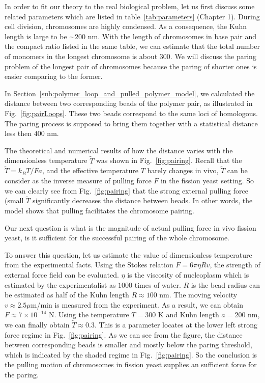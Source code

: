 In order to fit our theory to the real biological problem, let us first discuss some related parameters which are listed in table~\ref{tab:parameters} (Chapter 1). During cell division, chromosomes are highly condensed. As a consequence, the Kuhn length is large to be $\sim 200$ nm. With the length of chromosomes in base pair and the compact ratio listed in the same table, we can estimate that the total number of monomers in the longest chromosome is about $300$. We will discuss the paring problem of the longest pair of chromosomes because the paring of shorter ones is easier comparing to the former. 

In Section~\ref{sub:polymer_loop_and_pulled_polymer_model}, we calculated the distance between two corresponding beads of the polymer pair, as illustrated in Fig.~\ref{fig:pairLoops}. These two beads correspond to the same loci of homologous. The paring process is supposed to bring them together with a statistical distance less then $400$ nm. 

The theoretical and numerical results of how the distance varies with the dimensionless temperature $\tilde{T}$ was shown in Fig.~\ref{fig:pairing}. Recall that the $\tilde{T} = k_B T/F a$, and the effective temperature $T$ barely changes in vivo, $\tilde{T}$ can be consider as the inverse measure of pulling force $F$ in the fission yeast setting. So we can clearly see from Fig.~\ref{fig:pairing} that the strong external pulling force (small $\tilde{T}$ significantly decreases the distance between beads. In other words, the model shows that pulling facilitates the chromosome pairing.

Our next question is what is the magnitude of actual pulling force in vivo fission yeast, is it sufficient for the successful pairing of the whole chromosome. 

To answer this question, let us estimate the value of dimensionless temperature from the experimental facts. Using the Stokes relation $F = 6\pi\eta R v$, the strength of external force field can be evaluated. $\eta$ is the viscosity of nucleoplasm which is estimated by the experimentalist as $1000$ times of water. $R$ is the bead radius can be estimated as half of the Kuhn length $R \approx 100$ nm. The moving velocity $v \approx 2.5\mu$m/min is measured from the experiment. As a result, we can obtain $F \approx 7\times10^{-14}$ N. Using the temperature $T=300$ K and Kuhn length $a=200$ nm, we can finally obtain $\tilde{T} \approx 0.3$. This is a parameter locates at the lower left strong force regime in Fig.~\ref{fig:pairing}. As we can see from the figure, the distance between corresponding beads is smaller and mostly below the paring threshold, which is indicated by the shaded regime in Fig.~\ref{fig:pairing}. So the conclusion is the pulling motion of chromosomes in fission yeast supplies an sufficient force for the paring. 

